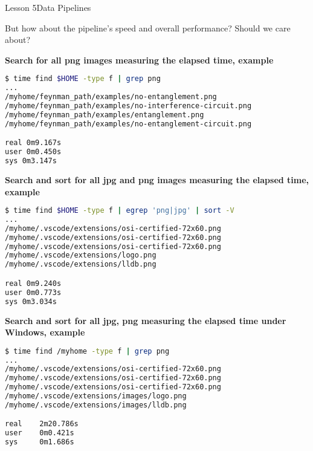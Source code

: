 \documentclass[aspectratio=1610]{beamer}
\begin{document}
\begin{frame}{Lesson 5}{Data Pipelines}
\Huge
\begin{center}
But how about the pipeline's \alert{speed} and overall
\alert{performance}? Should we care about?
\end{center}
\end{frame}



\begin{frame}[fragile]
\LARGE
\textbf{Search for all png images measuring the elapsed time, example}\\
\Large
\begin{lstlisting}[language=sh]
$ time find $HOME -type f | grep png
...
/myhome/feynman_path/examples/no-entanglement.png
/myhome/feynman_path/examples/no-interference-circuit.png
/myhome/feynman_path/examples/entanglement.png
/myhome/feynman_path/examples/no-entanglement-circuit.png

real 0m9.167s
user 0m0.450s
sys 0m3.147s
\end{lstlisting}
\end{frame}



\begin{frame}[fragile]
\LARGE
\textbf{Search  and sort for all jpg and png images measuring the elapsed time, example}\\
\Large
\begin{lstlisting}[language=sh]
$ time find $HOME -type f | egrep 'png|jpg' | sort -V
...
/myhome/.vscode/extensions/osi-certified-72x60.png
/myhome/.vscode/extensions/osi-certified-72x60.png
/myhome/.vscode/extensions/osi-certified-72x60.png
/myhome/.vscode/extensions/logo.png
/myhome/.vscode/extensions/lldb.png

real 0m9.240s
user 0m0.773s
sys 0m3.034s
\end{lstlisting}
\end{frame}


\begin{frame}[fragile]
\LARGE
\textbf{Search and sort for all jpg, png measuring the elapsed time under Windows, example}\\
\Large
\begin{lstlisting}[language=sh]
$ time find /myhome -type f | grep png
...
/myhome/.vscode/extensions/osi-certified-72x60.png
/myhome/.vscode/extensions/osi-certified-72x60.png
/myhome/.vscode/extensions/osi-certified-72x60.png
/myhome/.vscode/extensions/images/logo.png
/myhome/.vscode/extensions/images/lldb.png

real    2m20.786s
user    0m0.421s
sys     0m1.686s

\end{lstlisting}
\end{frame}
\end{document}
